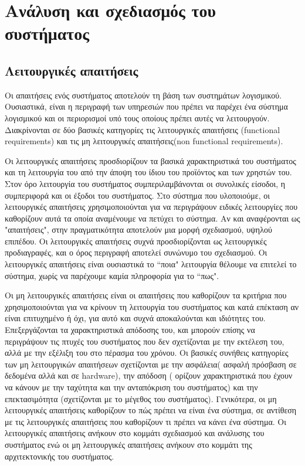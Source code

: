\graphicspath{ {Figures/system_analysis/} }

\chapter{Ανάλυση και σχεδιασμός του συστήματος}\label{ch:Analysis of LifeDonor}
\section{Λειτουργικές απαιτήσεις}\label{sec:Functional Requirements}

	Οι απαιτήσεις ενός συστήματος αποτελούν τη βάση των συστημάτων λογισμικού. Ουσιαστικά, είναι η περιγραφή των υπηρεσιών που πρέπει να παρέχει ένα σύστημα λογισμικού και οι περιορισμοί υπό τους οποίους πρέπει αυτές να λειτουργούν. Διακρίνονται σε δύο βασικές κατηγορίες τις λειτουργικές απαιτήσεις (functional requirements) και τις μη λειτουργικές απαιτήσεις(non functional requirements). 
	
	Οι λειτουργικές απαιτήσεις προσδιορίζουν τα βασικά χαρακτηριστικά του συστήματος και τη λειτουργία του από την άποψη του ίδιου του προϊόντος και των χρηστών του. Στον όρο λειτουργία του συστήματος συμπεριλαμβάνονται οι συνολικές είσοδοι, η συμπεριφορά και οι έξοδοι του συστήματος. Στο σύστημα που υλοποιούμε, οι λειτουργικές απαιτήσεις χρησιμοποιούνται για να περιγράψουν ειδικές λειτουργίες που καθορίζουν αυτά τα οποία αναμένουμε να πετύχει το σύστημα. Αν και αναφέρονται ως "απαιτήσεις", στην πραγματικότητα αποτελούν μια μορφή σχεδιασμού, υψηλού επιπέδου. Οι λειτουργικές απαιτήσεις συχνά προσδιορίζονται ως λειτουργικές προδιαγραφές, και ο όρος περιγραφή αποτελεί συνώνυμο του σχεδιασμού. Οι λειτουργικές απαιτήσεις είναι ουσιαστικά το ``ποια" λειτουργία θέλουμε να επιτελεί το σύστημα, χωρίς να παρέχουμε καμία πληροφορία για το ``πως".
	
	Οι μη λειτουργικές απαιτήσεις είναι οι απαιτήσεις που καθορίζουν τα κριτήρια που χρησιμοποιούνται για να κρίνουν τη λειτουργία του συστήματος και κατά επέκταση  αν είναι επιτυχημένο ή όχι, για αυτό και συχνά αποκαλούνται και ιδιότητες του. Επεξεργάζονται τα χαρακτηριστικά απόδοσης του, και μπορούν επίσης να περιγράψουν τις πτυχές του συστήματος που δεν σχετίζονται με την εκτέλεση του, αλλά με την εξέλιξη του στο πέρασμα του χρόνου. Οι βασικές συνήθεις κατηγορίες των μη λειτουργικών απαιτήσεων σχετίζονται με την ασφάλεια( ασφαλή πρόσβαση σε δεδομένα αλλά και σε hardware), την απόδοση ( ορίζουν χαρακτηριστικά που έχουν να κάνουν με την ταχύτητα και την ανταπόκριση του συστήματος) και την επεκτασιμότητα (σχετίζονται με το μέγεθος του συστήματος). Γενικότερα, οι μη λειτουργικές απαιτήσεις καθορίζουν το πώς πρέπει να είναι ένα σύστημα, σε αντίθεση με τις λειτουργικές απαιτήσεις που καθορίζουν τι πρέπει να κάνει ένα σύστημα. Οι λειτουργικές απαιτήσεις ανήκουν στο κομμάτι σχεδιασμού και ανάλυσης του συστήματος ενώ οι μη λειτουργικές απαιτήσεις ανήκουν στο κομμάτι της αρχιτεκτονικής του συστήματος.
	
